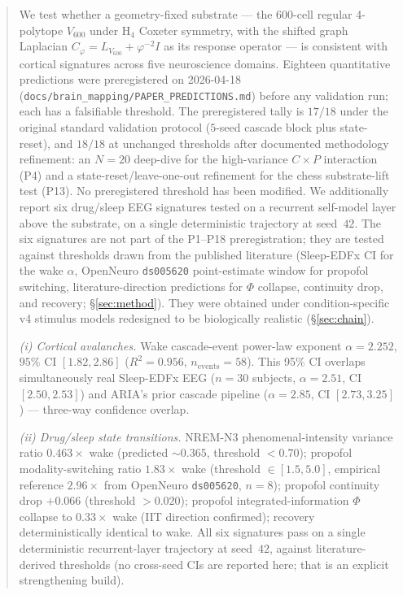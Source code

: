 \documentclass[11pt]{article}
\newcommand{\Ph}{\varphi}
\newcommand{\Lop}{L_{V_{600}}}
\newcommand{\Cph}{C_{\Ph}}
\newcommand{\Rsixhundred}{V_{600}}
\begin{document}
\begin{abstract}
We test whether a geometry-fixed substrate — the 600-cell regular
4-polytope $\Rsixhundred$ under H$_4$ Coxeter symmetry, with the
shifted graph Laplacian $\Cph = \Lop + \Ph^{-2} I$ as its response
operator — is consistent with cortical signatures across five
neuroscience domains. Eighteen quantitative predictions were
preregistered on 2026-04-18 (\texttt{docs/brain\_mapping/PAPER\_PREDICTIONS.md})
before any validation run; each has a falsifiable threshold. The
preregistered tally is $17/18$ under the original standard
validation protocol ($5$-seed cascade block plus state-reset), and
$18/18$ at unchanged thresholds after documented methodology
refinement: an $N\!=\!20$ deep-dive for the high-variance
$C\!\times\!P$ interaction (P4) and a state-reset/leave-one-out
refinement for the chess substrate-lift test (P13). No
preregistered threshold has been modified. We
additionally report six drug/sleep EEG signatures tested on a recurrent
self-model layer above the substrate, on a single deterministic
trajectory at seed~$42$. The six signatures are not part of the
P1--P18 preregistration; they are tested against thresholds drawn
from the published literature (Sleep-EDFx CI for the wake $\alpha$,
OpenNeuro \texttt{ds005620} point-estimate window for propofol
switching, literature-direction predictions for $\Phi$ collapse,
continuity drop, and recovery; \S\ref{sec:method}). They were
obtained under condition-specific v4 stimulus models redesigned to
be biologically realistic (\S\ref{sec:chain}).

\noindent\emph{(i) Cortical avalanches.}
Wake cascade-event power-law exponent $\alpha = 2.252$,
$95\%$ CI $[1.82, 2.86]$ ($R^{2}=0.956$, $n_{\mathrm{events}}=58$).
This 95\% CI overlaps simultaneously real Sleep-EDFx EEG ($n=30$
subjects, $\alpha=2.51$, CI $[2.50, 2.53]$) and ARIA's prior cascade
pipeline ($\alpha=2.85$, CI $[2.73, 3.25]$) — three-way confidence
overlap.

\noindent\emph{(ii) Drug/sleep state transitions.}
NREM-N3 phenomenal-intensity variance ratio $0.463\!\times$ wake
(predicted $\sim 0.365$, threshold $<\!0.70$); propofol modality-switching
ratio $1.83\!\times$ wake (threshold $\in[1.5, 5.0]$, empirical
reference $2.96\!\times$ from OpenNeuro \texttt{ds005620}, $n=8$);
propofol continuity drop $+0.066$ (threshold $>\!0.020$); propofol
integrated-information $\Phi$ collapse to $0.33\!\times$ wake (IIT
direction confirmed); recovery deterministically identical to wake.
All six signatures pass on a single deterministic recurrent-layer
trajectory at seed~$42$, against literature-derived thresholds
(no cross-seed CIs are reported here; that is an explicit
strengthening build).


\end{abstract}
\end{document}
